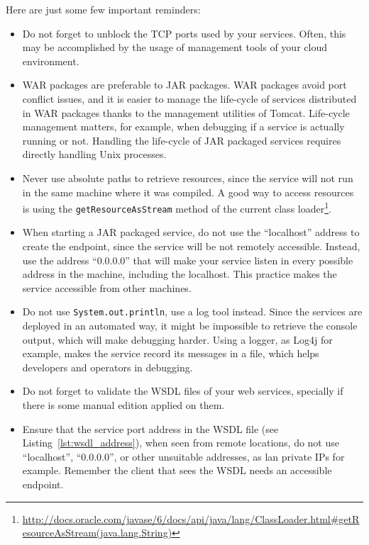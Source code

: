 Here are just some few important reminders:

\begin{itemize}

\item Do not forget to unblock the TCP ports used by your services. Often, this may be accomplished by the usage of management tools of your cloud environment.

\item WAR packages are preferable to JAR packages. WAR packages avoid port conflict issues, and it is easier to manage the life-cycle of services distributed in WAR packages thanks to the management utilities of Tomcat. Life-cycle management matters, for example, when debugging if a service is actually running or not. Handling the life-cycle of JAR packaged services requires directly handling Unix processes.

\item Never use absolute paths to retrieve resources, since the service will not run in the same machine where it was compiled. A good way to access resources is using the \texttt{getResourceAsStream} method of the current class loader\footnote{\url{http://docs.oracle.com/javase/6/docs/api/java/lang/ClassLoader.html\#getResourceAsStream(java.lang.String)}}.

\item When starting a JAR packaged service, do not use the ``localhost'' address to create the endpoint, since the service will be not remotely accessible. Instead, use the address ``0.0.0.0'' that will make your service listen in every possible address in the machine, including the localhost. This practice makes the service accessible from other machines.

\item Do not use \texttt{System.out.println}, use a log tool instead. Since the services are deployed in an automated way, it might be impossible to retrieve the console output, which will make debugging harder. Using a logger, as Log4j for example, makes the service record its messages in a file, which helps developers and operators in debugging.

\item Do not forget to validate the WSDL files of your web services, specially if there is some manual edition applied on them.

\item Ensure that the service port address in the WSDL file (see Listing~\ref{lst:wsdl_address}), when seen from remote locations, do not use ``localhost'', ``0.0.0.0'', or other unsuitable addresses, as lan private IPs for example. Remember the client that sees the WSDL needs an accessible endpoint.


\end{itemize}
